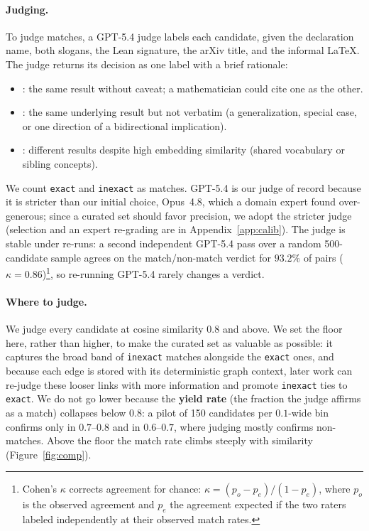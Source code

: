 \paragraph{Judging.} To judge matches, a GPT-5.4 judge labels each candidate, given the declaration name, both slogans, the Lean signature, the arXiv title, and the informal \LaTeX. The judge returns its decision as one label with a brief rationale:
\begin{itemize}
\setlength{\itemsep}{1pt}
\item {}: the same result without caveat; a mathematician could cite one as the other.
\item {}: the same underlying result but not verbatim (a generalization, special case, or one direction of a bidirectional implication).
\item {}: different results despite high embedding similarity (shared vocabulary or sibling concepts).
\end{itemize}
We count \texttt{exact} and \texttt{inexact} as matches. GPT-5.4 is our judge of record because it is stricter than our initial choice, Opus~4.8, which a domain expert found over-generous; since a curated set should favor precision, we adopt the stricter judge (selection and an expert re-grading are in Appendix~\ref{app:calib}). The judge is stable under re-runs: a second independent GPT-5.4 pass over a random 500-candidate sample agrees on the match/non-match verdict for $93.2\%$ of pairs ($\kappa{=}0.86$)\footnote{Cohen's $\kappa$ corrects agreement for chance: $\kappa = (p_o - p_e)/(1 - p_e)$, where $p_o$ is the observed agreement and $p_e$ the agreement expected if the two raters labeled independently at their observed match rates.}, so re-running GPT-5.4 rarely changes a verdict.

\paragraph{Where to judge.} We judge every candidate at cosine similarity $0.8$ and above. We set the floor here, rather than higher, to make the curated set as valuable as possible: it captures the broad band of \texttt{inexact} matches alongside the \texttt{exact} ones, and because each edge is stored with its deterministic graph context, later work can re-judge these looser links with more information and promote \texttt{inexact} ties to \texttt{exact}. We do not go lower because the \textbf{yield rate} (the fraction the judge affirms as a match) collapses below $0.8$: a pilot of 150 candidates per $0.1$-wide bin confirms only \yieldSeventy{} in $0.7$--$0.8$ and \yieldSixty{} in $0.6$--$0.7$, where judging mostly confirms non-matches. Above the floor the match rate climbs steeply with similarity (Figure~\ref{fig:comp}).

